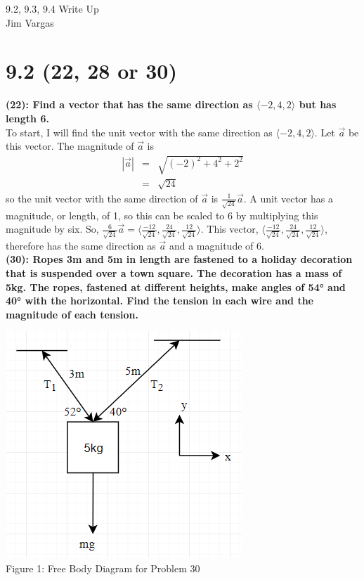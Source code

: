 \documentclass[12]{article}
\begin{document}
\begin{flushright}
9.2, 9.3, 9.4 Write Up\\
Jim Vargas
\end{flushright}

\section{9.2 (22, 28 or 30)}
\textbf{(22): Find a vector that has the same direction as $\langle -2,4,2 \rangle$ but has length 6.}\\

To start, I will find the unit vector with the same direction as $\langle -2,4,2 \rangle$. Let $\vec{a}$ be this vector. The magnitude of $\vec{a}$ is 
\begin{eqnarray}
|\vec{a}| &=& \sqrt{{(-2)}^2 + 4^2 + 2^2}\\
&=& \sqrt{24}
\end{eqnarray}
so the unit vector with the same direction of $\vec{a}$ is $\displaystyle{
\frac{1}{\sqrt{24}} \vec{a}}$. A unit vector has a magnitude, or length, of 1, so this can be scaled to 6 by multiplying this magnitude by six. So, $\displaystyle{ \frac{6}{\sqrt{24}} \vec{a} = \Big \langle \frac{-12}{\sqrt{24}}, \frac{24}{\sqrt{24}}, \frac{12}{\sqrt{24}} \Big\rangle
}$. This vector, $\displaystyle{\Big \langle \frac{-12}{\sqrt{24}}, \frac{24}{\sqrt{24}}, \frac{12}{\sqrt{24}} \Big\rangle}$, therefore has the same direction as $\vec{a}$ and a magnitude of 6.\\

\textbf{(30): Ropes 3m and 5m in length are fastened to a holiday decoration that is suspended over a town square. The decoration has a mass of 5kg. The ropes, fastened at different heights, make angles of \ang{54} and \ang{40} with the horizontal. Find the tension in each wire and the magnitude of each tension.}
\begin{center}
\includegraphics[scale=.75]{30_FBD.png}\\
Figure 1: Free Body Diagram for Problem 30
\end{center}
\end{document}
